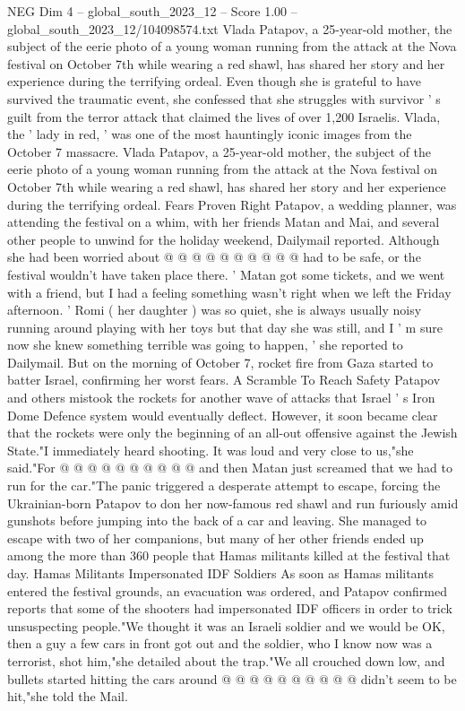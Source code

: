 \begin{textsample}{NEG Dim 4 – global\_south\_2023\_12 – Score 1.00 – global\_south\_2023\_12/104098574.txt}  \label{ex:f4_neg_319}
Vlada Patapov, a 25-year-old mother, the subject of the eerie photo of a young woman running from the attack at the Nova festival on October 7th while wearing a red shawl, has shared her story and her experience during the terrifying ordeal.
Even though she is grateful to have survived the traumatic event, she confessed that she struggles with survivor ' s guilt from the terror attack that claimed the lives of over 1,200 Israelis.
Vlada, the ' lady in red, ' was one of the most hauntingly iconic images from the October 7 massacre.
Vlada Patapov, a 25-year-old mother, the subject of the eerie photo of a young woman running from the attack at the Nova festival on October 7th while wearing a red shawl, has shared her story and her experience during the terrifying ordeal.
Fears Proven Right Patapov, a wedding planner, was attending the festival on a whim, with her friends Matan and Mai, and several other people to unwind for the holiday weekend, Dailymail reported.
Although she had been worried about @ @ @ @ @ @ @ @ @ @ had to be safe, or the festival wouldn't have taken place there. ' Matan got some tickets, and we went with a friend, but I had a feeling something wasn't right when we left the Friday afternoon. ' Romi ( her daughter ) was so quiet, she is always usually noisy running around playing with her toys but that day she was still, and I ' m sure now she knew something terrible was going to happen, ' she reported to Dailymail.
But on the morning of October 7, rocket fire from Gaza started to batter Israel, confirming her worst fears.
A Scramble To Reach Safety Patapov and others mistook the rockets for another wave of attacks that Israel ' s Iron Dome Defence system would eventually deflect.
However, it soon became clear that the rockets were only the beginning of an all-out offensive against the Jewish State."I immediately heard shooting.
It was loud and very close to us,"she said."For @ @ @ @ @ @ @ @ @ @ and then Matan just screamed that we had to run for the car."The panic triggered a desperate attempt to escape, forcing the Ukrainian-born Patapov to don her now-famous red shawl and run furiously amid gunshots before jumping into the back of a car and leaving.
She managed to escape with two of her companions, but many of her other friends ended up among the more than 360 people that Hamas militants killed at the festival that day.
Hamas Militants Impersonated IDF Soldiers As soon as Hamas militants entered the festival grounds, an evacuation was ordered, and Patapov confirmed reports that some of the shooters had impersonated IDF officers in order to trick unsuspecting people."We thought it was an Israeli soldier and we would be OK, then a guy a few cars in front got out and the soldier, who I know now was a terrorist, shot him,"she detailed about the trap."We all crouched down low, and bullets started hitting the cars around @ @ @ @ @ @ @ @ @ @ didn't seem to be hit,"she told the Mail.

\end{textsample}
